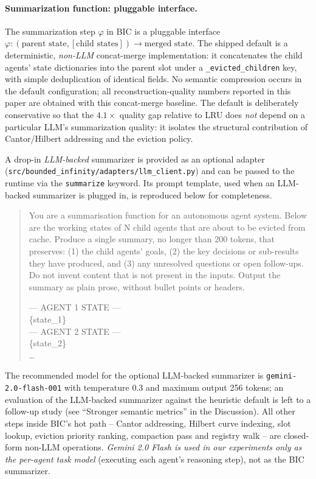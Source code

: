 \documentclass[fleqn,10pt]{article}
\theoremstyle{definition}
\newcommand{\summarize}{\varphi}
\begin{document}
\paragraph{Summarization function: pluggable interface.}
The summarization step $\summarize$ in BIC is a pluggable interface
$\summarize: (\text{parent state}, [\text{child states}]) \to
\text{merged state}$. The shipped default is a deterministic,
\emph{non-LLM} concat-merge implementation: it concatenates the
child agents' state dictionaries into the parent slot under a
\texttt{\_evicted\_children} key, with simple deduplication of
identical fields. No semantic compression occurs in the default
configuration; all reconstruction-quality numbers reported in this
paper are obtained with this concat-merge baseline. The default is
deliberately conservative so that the $4.1\times$ quality gap
relative to LRU does \emph{not} depend on a particular LLM's
summarization quality: it isolates the structural contribution of
Cantor/Hilbert addressing and the eviction policy.

A drop-in \emph{LLM-backed} summarizer is provided as an optional
adapter (\texttt{src/bounded\_infinity/adapters/llm\_client.py}) and
can be passed to the runtime via the \texttt{summarize} keyword. Its
prompt template, used when an LLM-backed summarizer is plugged in,
is reproduced below for completeness.

\begin{quote}\small\ttfamily
You are a summarisation function for an autonomous agent system.
Below are the working states of N child agents that are about to
be evicted from cache. Produce a single summary, no longer than
200 tokens, that preserves: (1) the child agents' goals, (2) the
key decisions or sub-results they have produced, and (3) any
unresolved questions or open follow-ups. Do not invent content
that is not present in the inputs. Output the summary as plain
prose, without bullet points or headers.

\noindent--- AGENT 1 STATE ---\\
\{state\_1\}\\
--- AGENT 2 STATE ---\\
\{state\_2\}\\
\dots
\end{quote}

The recommended model for the optional LLM-backed summarizer is
\texttt{gemini-2.0-flash-001} with temperature 0.3 and maximum
output 256 tokens; an evaluation of the LLM-backed summarizer
against the heuristic default is left to a follow-up study (see
``Stronger semantic metrics'' in the Discussion). All other steps
inside BIC's hot path -- Cantor addressing, Hilbert curve indexing,
slot lookup, eviction priority ranking, compaction pass and
registry walk -- are closed-form non-LLM operations. \emph{Gemini
2.0 Flash is used in our experiments only as the per-agent task
model} (executing each agent's reasoning step), not as the BIC
summarizer.
\end{document}
